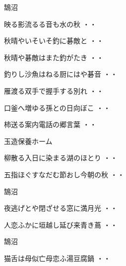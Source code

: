 \vspace{0.6cm}
鵠沼
\begin{shiika}映る影流るる音も水の秋
\hfill{・・}\end{shiika}
\begin{shiika}秋晴やいそいそ釣に碁敵と
\hfill{・・}\end{shiika}
\vspace{0.6cm}
\begin{shiika}秋晴や碁敵はまた釣がたき
\hfill{・・}\end{shiika}
\vspace{0.6cm}
\begin{shiika}釣りし沙魚はねる厨にはや碁音
\hfill{・・}\end{shiika}
\vspace{0.6cm}
\begin{shiika}雁渡る双手で握手する別れ
\hfill{・・}\end{shiika}
\vspace{0.6cm}
\begin{shiika}口釜へ増ゆる孫との日向ぼこ
\hfill{・・}\end{shiika}
\vspace{0.6cm}
\begin{shiika}柿送る案内電話の郷言葉
\hfill{・・}\end{shiika}
\vspace{0.6cm}
玉造保養ホーム
\begin{shiika}柳散る入日に染まる湖のほとり
\hfill{・・}\end{shiika}
\begin{shiika}五指ほぐすなだむ節おし今朝の秋
\hfill{・・}\end{shiika}
\vspace{0.6cm}
鵠沼
\begin{shiika}夜逃げとや閉ざせる窓に満月光
\hfill{・・}\end{shiika}
\begin{shiika}人恋ふかに垣越し延び来青き蔦
\hfill{・・}\end{shiika}
\vspace{0.6cm}
鵠沼
\begin{shiika}猫舌は母似亡母恋ふ湯豆腐鍋
\hfill{・・}\end{shiika}
